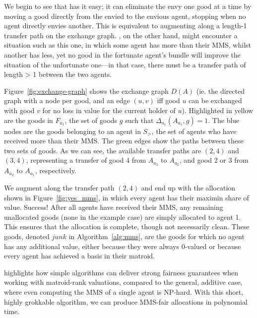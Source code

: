 We begin to see that  has it easy; it can eliminate the envy one good at a time by moving a good directly from the envied to the envious agent, stopping when no agent directly envies another. This is equivalent to augmenting along a length-1 transfer path on the exchange graph. , on the other hand, might encounter a situation such as this one, in which some agent has more than their MMS, whilst another has less, yet no good in the fortunate agent's bundle will improve the situation of the unfortunate one---in that case, there must be a transfer path of length > 1 between the two agents.



Figure~\ref{fig:exchange-graph} shows the exchange graph $D(A)$ (ie. the directed graph with a node per good, and an edge $(u,v)$ iff good $u$ can be exchanged with good $v$ for no loss in value for the current holder of $u$). Highlighted in yellow are the goods in $F_{a_1}$, the set of goods $g$ such that $\Delta_{a_1}(A_{a_1}, g) = 1$. The blue nodes are the goods belonging to an agent in $S_>$, the set of agents who have received more than their MMS. The green edges show the paths between these two sets of goods. As we can see, the available transfer paths are $(2,4)$ and $(3,4)$, representing a transfer of good 4 from $A_{a_3}$ to $A_{a_2}$, and good 2 or 3 from $A_{a_2}$ to $A_{a_1}$, respectively.

We augment along the transfer path $(2,4)$ and end up with the allocation shown in Figure~\ref{fig:yes_mms}, in which every agent has their maximin share of value. Success! After all agents have received their MMS, any remaining unallocated goods (none in the example case) are simply allocated to agent 1. This ensures that the allocation is complete, though not necessarily clean. These goods, denoted $junk$ in Algorithm~\ref{alg:mms}, are the goods for which no agent has any additional value, either because they were always 0-valued or because every agent has achieved a basis in their matroid.

 highlights how simple algorithms can deliver strong fairness guarantees when working with matroid-rank valuations, compared to the general, additive case, where even computing the MMS of a single agent is NP-hard. With this short, highly grokkable algorithm, we can produce MMS-fair allocations in polynomial time.

